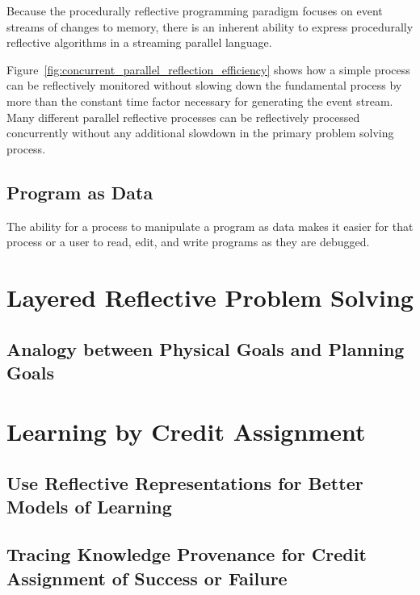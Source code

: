 Because the procedurally reflective programming paradigm focuses on
event streams of changes to memory, there is an inherent ability to
express procedurally reflective algorithms in a streaming parallel
language.

Figure~\ref{fig:concurrent_parallel_reflection_efficiency} shows how a
simple process can be reflectively monitored without slowing down the
fundamental process by more than the constant time factor necessary
for generating the event stream.  Many different parallel reflective
processes can be reflectively processed concurrently without any
additional slowdown in the primary problem solving process.

\subsection{Program as Data}

The ability for a process to manipulate a program as data makes it
easier for that process or a user to read, edit, and write programs as
they are debugged.


\section{Layered Reflective Problem Solving}

\subsection{Analogy between Physical Goals and Planning Goals}


\section{Learning by Credit Assignment}

\subsection{Use Reflective Representations for Better Models of Learning}

\subsection{Tracing Knowledge Provenance for Credit Assignment of Success or Failure}



